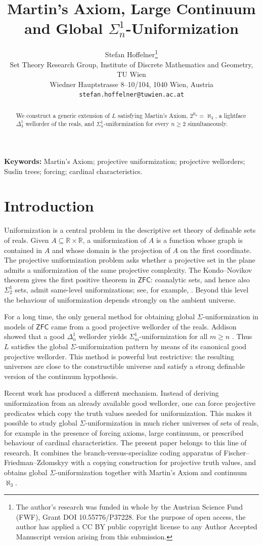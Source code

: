 \documentclass[11pt]{article}
\title{Martin's Axiom, Large Continuum and Global $\Sigma^1_n$-Uniformization}
\author{Stefan Hoffelner\footnote{The author's research was funded in whole by the Austrian Science Fund (FWF), Grant DOI 10.55776/P37228. For the purpose of open access, the author has applied a CC BY public copyright license to any Author Accepted Manuscript version arising from this submission.}\\
Set Theory Research Group, Institute of Discrete Mathematics and Geometry, TU Wien\\
Wiedner Hauptstrasse 8--10/104, 1040 Wien, Austria\\
\texttt{stefan.hoffelner@tuwien.ac.at}}
\date{}
\theoremstyle{plain}
\theoremstyle{definition}
\theoremstyle{remark}
\newcommand{\Rr}{\mathbb R}
\newcommand{\ZFC}{\mathsf{ZFC}}
\begin{document}
\maketitle

\begin{abstract}
We construct a generic extension of $L$ satisfying Martin's Axiom,
$2^{\aleph_0}=\aleph_3$, a lightface $\Delta^1_3$ wellorder of the reals, and
$\Sigma^1_n$-uniformization for every $n\geq 2$ simultaneously. 
\end{abstract}

\medskip
\noindent\textbf{Keywords:} Martin's Axiom; projective uniformization; projective wellorders; Suslin trees; forcing; cardinal characteristics.


\section{Introduction}

Uniformization is a central problem in the descriptive set theory of definable
sets of reals.  Given \(A\subseteq\Rr\times\Rr\), a uniformization of \(A\) is a
function whose graph is contained in \(A\) and whose domain is the projection of
\(A\) on the first coordinate.  The projective uniformization problem asks
whether a projective set in the plane admits a uniformization of the same
projective complexity.  The Kondo--Novikov theorem gives the first positive
theorem in \(\ZFC\): coanalytic sets, and hence also \(\Sigma^1_2\) sets, admit
same-level uniformizations; see, for example, \cite{Kechris}.  Beyond this level
the behaviour of uniformization depends strongly on the ambient universe.

For a long time, the only general method for obtaining global
\(\Sigma\)-uniformization in models of \(\ZFC\) came from a good projective
wellorder of the reals.  Addison showed that a good \(\Delta^1_n\) wellorder
yields \(\Sigma^1_m\)-uniformization for all \(m\geq n\)
\cite{Addison}.  Thus \(L\) satisfies the global
\(\Sigma\)-uniformization pattern by means of its canonical good projective
wellorder.  This method is powerful but restrictive: the resulting universes are
close to the constructible universe and satisfy a strong definable version of
the continuum hypothesis.

Recent work has produced a different mechanism.  Instead of deriving
uniformization from an already available good wellorder, one can force
projective predicates which copy the truth values needed for uniformization.
This makes it possible to study global \(\Sigma\)-uniformization in much richer
universes of sets of reals, for example in the presence of forcing axioms, large
continuum, or prescribed behaviour of cardinal characteristics.  The present
paper belongs to this line of research.  It combines the
branch-versus-specialize coding apparatus of Fischer--Friedman--Zdomskyy with a
copying construction for projective truth values, and obtains global
\(\Sigma\)-uniformization together with Martin's Axiom and continuum
\(\aleph_3\).
\end{document}
